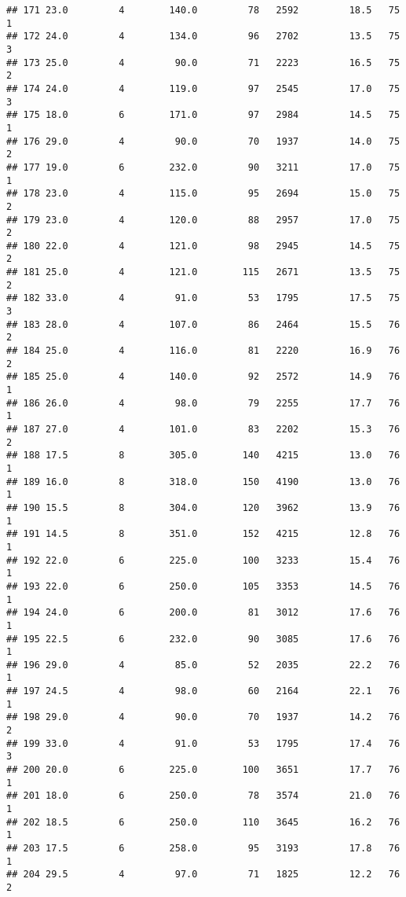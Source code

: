 \documentclass[
]{article}
\begin{document}
\begin{verbatim}
## 171 23.0         4        140.0         78   2592         18.5   75      1
## 172 24.0         4        134.0         96   2702         13.5   75      3
## 173 25.0         4         90.0         71   2223         16.5   75      2
## 174 24.0         4        119.0         97   2545         17.0   75      3
## 175 18.0         6        171.0         97   2984         14.5   75      1
## 176 29.0         4         90.0         70   1937         14.0   75      2
## 177 19.0         6        232.0         90   3211         17.0   75      1
## 178 23.0         4        115.0         95   2694         15.0   75      2
## 179 23.0         4        120.0         88   2957         17.0   75      2
## 180 22.0         4        121.0         98   2945         14.5   75      2
## 181 25.0         4        121.0        115   2671         13.5   75      2
## 182 33.0         4         91.0         53   1795         17.5   75      3
## 183 28.0         4        107.0         86   2464         15.5   76      2
## 184 25.0         4        116.0         81   2220         16.9   76      2
## 185 25.0         4        140.0         92   2572         14.9   76      1
## 186 26.0         4         98.0         79   2255         17.7   76      1
## 187 27.0         4        101.0         83   2202         15.3   76      2
## 188 17.5         8        305.0        140   4215         13.0   76      1
## 189 16.0         8        318.0        150   4190         13.0   76      1
## 190 15.5         8        304.0        120   3962         13.9   76      1
## 191 14.5         8        351.0        152   4215         12.8   76      1
## 192 22.0         6        225.0        100   3233         15.4   76      1
## 193 22.0         6        250.0        105   3353         14.5   76      1
## 194 24.0         6        200.0         81   3012         17.6   76      1
## 195 22.5         6        232.0         90   3085         17.6   76      1
## 196 29.0         4         85.0         52   2035         22.2   76      1
## 197 24.5         4         98.0         60   2164         22.1   76      1
## 198 29.0         4         90.0         70   1937         14.2   76      2
## 199 33.0         4         91.0         53   1795         17.4   76      3
## 200 20.0         6        225.0        100   3651         17.7   76      1
## 201 18.0         6        250.0         78   3574         21.0   76      1
## 202 18.5         6        250.0        110   3645         16.2   76      1
## 203 17.5         6        258.0         95   3193         17.8   76      1
## 204 29.5         4         97.0         71   1825         12.2   76      2

\end{verbatim}
\end{document}
